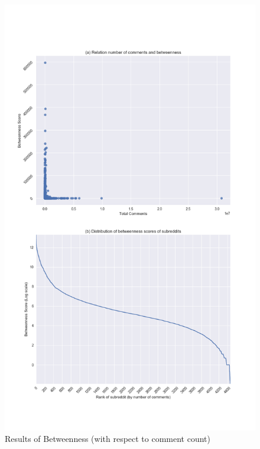 \documentclass[bsc,frontabs,twoside,singlespacing,parskip,deptreport]{infthesis}
\begin{document}
\begin{figure}[p]
	\centering
  	\includegraphics[width=\textwidth]{betweenness.png}
  	\caption{Results of Betweenness (with respect to comment count)}
  	\label{fig:betweenness}
\end{figure}
\end{document}
